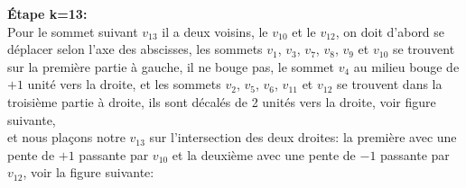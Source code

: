 \documentclass[hidelinks,letterpaper,12pt]{article}
\begin{document}
\newpage
\textbf{Étape k=13:}
\\
Pour le sommet suivant $v_{13}$ il a deux voisins, le $v_{10}$ et le $v_{12}$,
on doit d'abord se déplacer selon l'axe des abscisses, 
les sommets $v_1$, $v_3$, $v_7$, $v_8$, $v_9$ et $v_{10}$ se trouvent sur la première partie à gauche, il ne bouge pas, 	
le sommet $v_4$ au milieu bouge de $+1$ unité vers la droite,
et les sommets $v_2$, $v_5$, $v_6$, $v_{11}$ et $v_{12}$ se trouvent dans la troisième partie à droite, ils sont décalés de 2 unités vers la droite, voir figure suivante, \\
et nous plaçons notre $v_{13}$ sur l'intersection des deux droites: la première avec une pente de $+1$ passante par $v_{10}$ et la deuxième avec une pente de $-1$ passante par $v_{12}$, voir la figure suivante:
\end{document}
